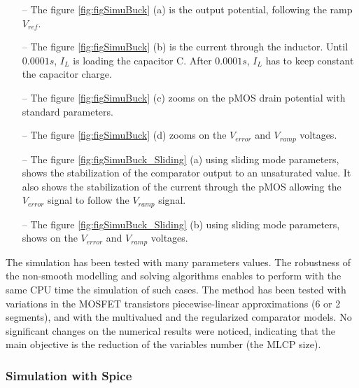 \begin{enumerate}
  \item[--] The figure \ref{fig:figSimuBuck} (a) is the output potential, following the ramp $V_{ref}$.
    \item[--] The figure \ref{fig:figSimuBuck} (b) is the current through the inductor. Until $0.0001s$, $I_L$
    is loading the capacitor C. After $0.0001s$, $I_L$ has to keep constant the capacitor charge.
    \item[--] The figure \ref{fig:figSimuBuck} (c) zooms on the pMOS drain potential with standard
    parameters.
    \item[--] The figure  \ref{fig:figSimuBuck} (d) zooms on the $V_{error}$ and $V_{ramp}$ voltages.
    \item[--] The figure  \ref{fig:figSimuBuck_Sliding} (a) using sliding mode parameters, shows the stabilization of the comparator output to an unsaturated value. It also shows
      the stabilization of the current through the pMOS allowing the $V_{error}$ signal to follow the $V_{ramp}$
    signal.    
    \item[--] The figure \ref{fig:figSimuBuck_Sliding} (b) using sliding mode parameters, shows on the $V_{error}$ and $V_{ramp}$ voltages.
  \end{enumerate}




The simulation has been tested with many parameters values. The robustness of the non-smooth modelling and solving algorithms enables to perform with the same CPU time the simulation of such cases. The method has been tested with variations in the MOSFET transistors piecewise-linear approximations (6 or 2 segments), and with the multivalued and the regularized comparator models. No significant changes on the numerical results were noticed, indicating that the main objective is the reduction of the variables number (the MLCP size).  



\subsubsection{Simulation with {\sc Spice} }

